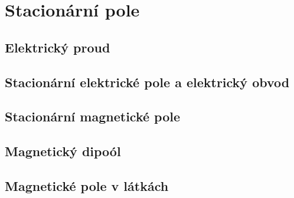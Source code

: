 \graphicspath{{../src/FYZ/img/}}
\setchaptertoc
\chapter{Stacionární pole}\label{fyz:IIIchapIII}
  \section{Elektrický proud}\label{fyz:IIIchapIIIsecI}
  \section{Stacionární elektrické pole a elektrický obvod}\label{fyz:IIIchapIIIsecII}
  \section{Stacionární magnetické pole}\label{fyz:IIIchapIIIsecIII}
  \section{Magnetický dipoól}\label{fyz:IIIchapIIIsecIV}
  \section{Magnetické pole v látkách}\label{fyz:IIIchapIIIsecV}

